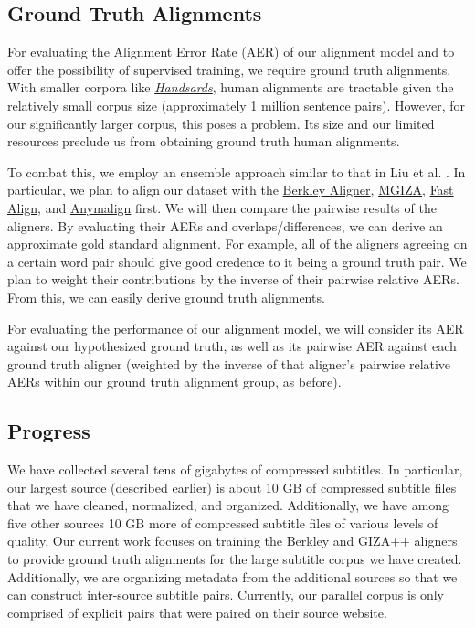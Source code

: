 \documentclass[twoside,twocolumn]{article}
\begin{document}
\subsection{Ground Truth Alignments}
\label{subsec:ground-truth-alignments}

For evaluating the Alignment Error Rate (AER) of our alignment model and to
offer the possibility of supervised training, we require ground truth
alignments. With smaller corpora like
\href{https://www.isi.edu/natural-language/download/hansard/}{\textit{Handsards}},
human alignments are tractable given the relatively small corpus size
(approximately 1 million sentence pairs). However, for our significantly larger
corpus, this poses a problem. Its size and our limited resources preclude us
from obtaining ground truth human alignments.

To combat this, we employ an ensemble approach similar to that in Liu et al.
\cite{liu2015streaming}. In particular, we plan to align our dataset with
the
\href{http://nlp.cs.berkeley.edu/projects/historical.shtml#WordAligner}{Berkley Aligner},
\href{https://clear.colorado.edu/CompSemWiki/index.php/MGIZA\%2B\%2B}{MGIZA},
\href{https://github.com/clab/fast\_align}{Fast Align}, and
\href{https://anymalign.limsi.fr/}{Anymalign} first. We will then compare the
pairwise results of the aligners. By evaluating their AERs and
overlaps/differences, we can derive an approximate gold standard alignment. For
example, all of the aligners agreeing on a certain word pair should give good
credence to it being a ground truth pair. We plan to weight their contributions
by the inverse of their pairwise relative AERs. From this, we can easily derive
ground truth alignments.

For evaluating the performance of our alignment model, we will consider its
AER against our hypothesized ground truth, as well as its pairwise AER against
each ground truth aligner (weighted by the inverse of that aligner's pairwise
relative AERs within our ground truth alignment group, as before).

\subsection{Progress}

We have collected several tens of gigabytes of compressed subtitles. In
particular, our largest source (described earlier) is about 10 GB of compressed
subtitle files that we have cleaned, normalized, and organized. Additionally,
we have among five other sources 10 GB more of compressed subtitle files of
various levels of quality. Our current work focuses on training the Berkley
and GIZA++ aligners to provide ground truth alignments for the large subtitle
corpus we have created. Additionally, we are organizing metadata from the
additional sources so that we can construct inter-source subtitle pairs.
Currently, our parallel corpus is only comprised of explicit pairs that were
paired on their source website.
\end{document}
